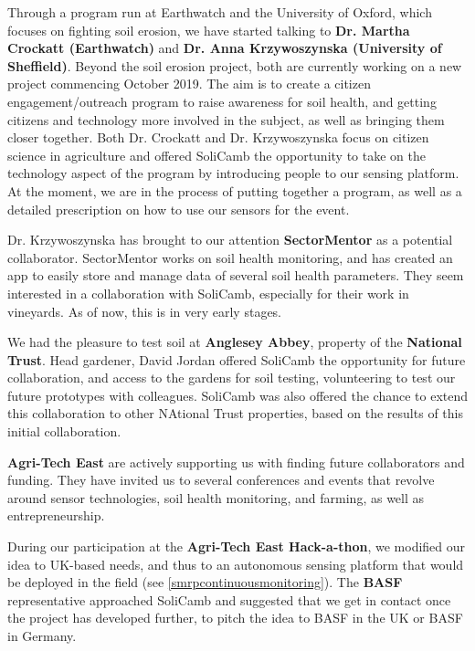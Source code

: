     Through a program run at Earthwatch and the University of Oxford, which focuses on fighting soil erosion, we have started talking to \textbf{Dr. Martha Crockatt (Earthwatch)} and \textbf{Dr. Anna Krzywoszynska (University of Sheffield)}. Beyond the soil erosion project, both are currently working on a new project commencing October 2019. The aim is to create a citizen engagement/outreach program to raise awareness for soil health, and getting citizens and technology more involved in the subject, as well as bringing them closer together. Both Dr. Crockatt and Dr. Krzywoszynska focus on citizen science in agriculture and offered SoliCamb the opportunity to take on the technology aspect of the program by introducing people to our sensing platform. At the moment, we are in the process of putting together a program, as well as a detailed prescription on how to use our sensors for the event.
    
    Dr. Krzywoszynska has brought to our attention \textbf{SectorMentor} as a potential collaborator. SectorMentor works on soil health monitoring, and has created an app to easily store and manage data of several soil health parameters. They seem interested in a collaboration with SoliCamb, especially for their work in vineyards. As of now, this is in very early stages.
    
    We had the pleasure to test soil at \textbf{Anglesey Abbey}, property of the \textbf{National Trust}. Head gardener, David Jordan offered SoliCamb the opportunity for future collaboration, and access to the gardens for soil testing,  volunteering to test our future prototypes with colleagues. SoliCamb was also offered the chance to extend this collaboration to other NAtional Trust properties, based on the results of this initial collaboration.
    
    \textbf{Agri-Tech East} are actively supporting us with finding future collaborators and funding. They have invited us to several conferences and events that revolve around sensor technologies, soil health monitoring, and farming, as well as entrepreneurship.
    
    During our participation at the \textbf{Agri-Tech East Hack-a-thon}, we modified our idea to UK-based needs, and thus to an autonomous sensing platform that would be deployed in the field (see \cref{smrpcontinuousmonitoring}). The \textbf{BASF} representative approached SoliCamb and suggested that we get in contact once the project has developed further, to pitch the idea to BASF in the UK or BASF in Germany. 
    
